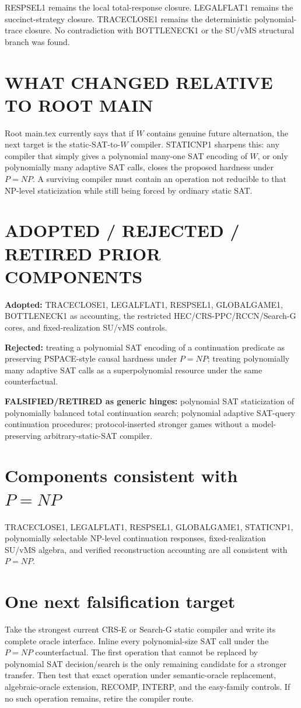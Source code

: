 \documentclass[11pt]{article}
\begin{document}
RESPSEL1 remains the local total-response closure. LEGALFLAT1 remains the succinct-strategy closure. TRACECLOSE1 remains the deterministic polynomial-trace closure. No contradiction with BOTTLENECK1 or the SU/vMS structural branch was found.

\section*{WHAT CHANGED RELATIVE TO ROOT MAIN}
Root main.tex currently says that if \(W\) contains genuine future alternation, the next target is the static-SAT-to-\(W\) compiler. STATICNP1 sharpens this: any compiler that simply gives a polynomial many-one SAT encoding of \(W\), or only polynomially many adaptive SAT calls, closes the proposed hardness under \(P=NP\). A surviving compiler must contain an operation not reducible to that NP-level staticization while still being forced by ordinary static SAT.

\section*{ADOPTED / REJECTED / RETIRED PRIOR COMPONENTS}
\textbf{Adopted:} TRACECLOSE1, LEGALFLAT1, RESPSEL1, GLOBALGAME1, BOTTLENECK1 as accounting, the restricted HEC/CRS-PPC/RCCN/Search-G cores, and fixed-realization SU/vMS controls.

\textbf{Rejected:} treating a polynomial SAT encoding of a continuation predicate as preserving PSPACE-style causal hardness under \(P=NP\); treating polynomially many adaptive SAT calls as a superpolynomial resource under the same counterfactual.

\textbf{FALSIFIED/RETIRED as generic hinges:} polynomial SAT staticization of polynomially balanced total continuation search; polynomial adaptive SAT-query continuation procedures; protocol-inserted stronger games without a model-preserving arbitrary-static-SAT compiler.

\section*{Components consistent with \(P=NP\)}
TRACECLOSE1, LEGALFLAT1, RESPSEL1, GLOBALGAME1, STATICNP1, polynomially selectable NP-level continuation responses, fixed-realization SU/vMS algebra, and verified reconstruction accounting are all consistent with \(P=NP\).

\section*{One next falsification target}
Take the strongest current CRS-E or Search-G static compiler and write its complete oracle interface. Inline every polynomial-size SAT call under the \(P=NP\) counterfactual. The first operation that cannot be replaced by polynomial SAT decision/search is the only remaining candidate for a stronger transfer. Then test that exact operation under semantic-oracle replacement, algebraic-oracle extension, RECOMP, INTERP, and the easy-family controls. If no such operation remains, retire the compiler route.
\end{document}
